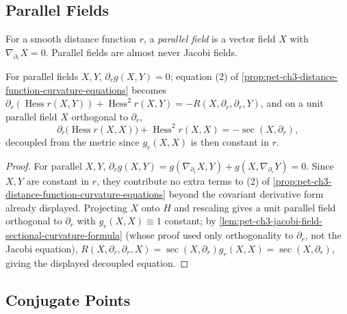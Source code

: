 \subsection{Parallel Fields}

\begin{definition}
  \label{def:pet-ch3-parallel-field}
  \leanok
  For a smooth distance function $r$, a \emph{parallel field} is a vector field
  $X$ with $\nabla_{\partial_r}X=0$. Parallel fields are almost never Jacobi
  fields.
\end{definition}

\begin{proposition}
  \label{prop:pet-ch3-parallel-field-curvature-equation}
  \leanok
  For parallel fields $X,Y$, $\partial_rg(X,Y)=0$; equation (2) of
  \cref{prop:pet-ch3-distance-function-curvature-equations} becomes
  $\partial_r(\operatorname{Hess}r(X,Y))+\operatorname{Hess}^2r(X,Y)=-R(X,\partial_r,\partial_r,Y)$,
  and on a unit parallel field $X$ orthogonal to $\partial_r$,
  \[
    \partial_r\big(\operatorname{Hess}r(X,X)\big)+\operatorname{Hess}^2r(X,X)=-\sec(X,\partial_r),
  \]
  decoupled from the metric since $g_r(X,X)$ is then constant in $r$.
\end{proposition}
\begin{proof}
  \leanok
  For parallel $X,Y$, $\partial_rg(X,Y)=g(\nabla_{\partial_r}X,Y)+g(X,\nabla_{\partial_r}Y)=0$.
  Since $X,Y$ are constant in $r$, they contribute no extra terms to (2) of
  \cref{prop:pet-ch3-distance-function-curvature-equations} beyond the covariant
  derivative form already displayed. Projecting $X$ onto $H$ and rescaling gives
  a unit parallel field orthogonal to $\partial_r$ with $g_r(X,X)\equiv1$
  constant; by \cref{lem:pet-ch3-jacobi-field-sectional-curvature-formula} (whose
  proof used only orthogonality to $\partial_r$, not the Jacobi equation),
  $R(X,\partial_r,\partial_r,X)=\sec(X,\partial_r)g_r(X,X)=\sec(X,\partial_r)$, giving the
  displayed decoupled equation.
\end{proof}

\subsection{Conjugate Points}

